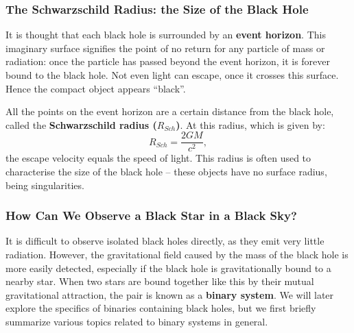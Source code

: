 
\subsubsection{The Schwarzschild Radius: the Size of the Black Hole}
\label{cha:Introduction:sec:BlackHoles:subsubsec:EventHorizon}

It is thought that each black hole is surrounded by an \textbf{event
horizon}. This imaginary surface signifies the point of no return for any particle of mass
or radiation: once the particle has passed beyond the event horizon,
it is forever bound to the black hole. Not even light can escape, once it crosses this surface. Hence the compact object appears ``black''. %

\vspace{\myparskip}

All the points on the event horizon are a certain distance from the black hole, called the
\textbf{Schwarzschild radius ($R_{Sch}$)}. %
At this radius, which is given by:
\begin{equation}
\label{cha:Introduction:sec:BlackHoles:eqn:R_Sch}
R_{Sch} = \frac{2 G M}{c^2},
\end{equation}
the escape velocity equals the speed of light. This radius is often used to characterise the size of the black hole -- these objects have no surface radius, being singularities. %


\subsubsection{How Can We Observe a Black Star in a Black Sky?}
\label{cha:Introduction:sec:BlackHoles:subsubsec:HowCanWeObserveABlackStarInABlackSky}

It is difficult to observe isolated black holes directly, as they emit
very little radiation. However, the gravitational field caused by the mass of
the black hole is more easily detected, especially if the black hole
is gravitationally bound to a nearby star. When two stars are bound
together like this by their mutual gravitational attraction, the pair is known
as a \textbf{binary system}. We will later explore the specifics of
binaries containing black holes, but we first briefly summarize various topics
related to binary systems in general. %

